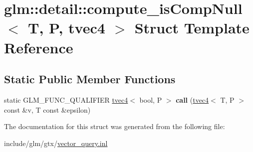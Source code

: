 \hypertarget{structglm_1_1detail_1_1compute__isCompNull_3_01T_00_01P_00_01tvec4_01_4}{}\section{glm\+:\+:detail\+:\+:compute\+\_\+is\+Comp\+Null$<$ T, P, tvec4 $>$ Struct Template Reference}
\label{structglm_1_1detail_1_1compute__isCompNull_3_01T_00_01P_00_01tvec4_01_4}
\subsection*{Static Public Member Functions}
\begin{DoxyCompactItemize}
\item 
\mbox{\label{structglm_1_1detail_1_1compute__isCompNull_3_01T_00_01P_00_01tvec4_01_4_a6c98752b295461f1d83f44ecbb22aadf}} 
static G\+L\+M\+\_\+\+F\+U\+N\+C\+\_\+\+Q\+U\+A\+L\+I\+F\+I\+ER \hyperlink{structglm_1_1tvec4}{tvec4}$<$ bool, P $>$ {\bfseries call} (\hyperlink{structglm_1_1tvec4}{tvec4}$<$ T, P $>$ const \&v, T const \&epsilon)
\end{DoxyCompactItemize}


The documentation for this struct was generated from the following file\+:\begin{DoxyCompactItemize}
\item 
include/glm/gtx/\hyperlink{vector__query_8inl}{vector\+\_\+query.\+inl}\end{DoxyCompactItemize}
